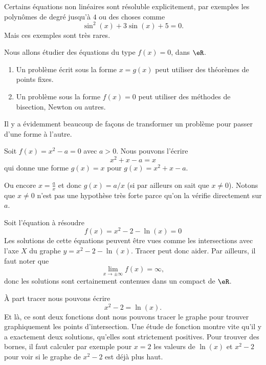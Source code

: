 Certains équations non linéaires sont résoluble explicitement, par exemples les polynômes de degré jusqu'à \( 4\) ou des choses comme
\begin{equation}
	\sin^2(x)+3\sin(x)+5=0.
\end{equation}
Mais ces exemples sont très rares.

Nous allons étudier des équations du type \( f(x)=0\), dans \( \eR\).

\begin{enumerate}
	\item
Un problème écrit sous la forme \( x=g(x)\) peut utiliser des théorèmes de points fixes.
\item
	Un problème sous la forme \( f(x)=0\) peut utiliser des méthodes de bisection, Newton ou autres.
\end{enumerate}
Il y a évidemment beaucoup de façons de transformer un problème pour passer d'une forme à l'autre.

\begin{example}
	Soit \( f(x)=x^2-a=0\) avec \( a>0\). Nous pouvons l'écrire
	\begin{equation}
		x^2+x-a=x
	\end{equation}
	qui donne une forme \( g(x)=x\) pour \( g(x)=x^2+x-a\).

	Ou encore \( x=\frac{ a }{ x }\) et donc \( g(x)=a/x\) (si par ailleurs on sait que \( x\neq 0\)). Notons que \( x\neq 0\) n'est pas une hypothèse très forte parce qu'on la vérifie directement sur \( a\).
\end{example}

\begin{example}
	Soit l'équation à résoudre
	\begin{equation}
		f(x)=x^2-2-\ln(x)=0
	\end{equation}
	Les solutions de cette équations peuvent être vues comme les intersections avec l'axe \( X\) du graphe \( y=x^2-2-\ln(x)\). Tracer peut donc aider. Par ailleurs, il faut noter que
	\begin{equation}
		\lim_{x\to \pm\infty} f(x)=\infty,
	\end{equation}
	donc les solutions sont certainement contenues dans un compact de \( \eR\).

	À part tracer nous pouvons écrire
	\begin{equation}
		x^2-2=\ln(x).
	\end{equation}
	Et là, ce sont deux fonctions dont nous pouvons tracer le graphe pour trouver graphiquement les points d'intersection. Une étude de fonction montre vite qu'il y a exactement deux solutions, qu'elles sont strictement positives. Pour trouver des bornes, il faut calculer par exemple pour \( x=2\) les valeurs de \( \ln(x)\) et \( x^2-2\) pour voir si le graphe de \( x^2-2\) est déjà plus haut.
\end{example}

